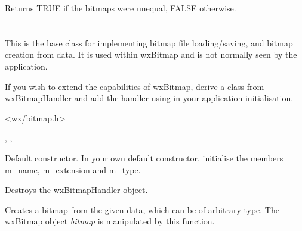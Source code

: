 
Returns TRUE if the bitmaps were unequal, FALSE otherwise.

\section{}\label{wxbitmaphandler}


This is the base class for implementing bitmap file loading/saving, and bitmap creation from data.
It is used within wxBitmap and is not normally seen by the application.

If you wish to extend the capabilities of wxBitmap, derive a class from wxBitmapHandler
and add the handler using  in your
application initialisation.




<wx/bitmap.h>


, , 


\label{wxbitmaphandlerconstr}


Default constructor. In your own default constructor, initialise the members
m\_name, m\_extension and m\_type.



Destroys the wxBitmapHandler object.



Creates a bitmap from the given data, which can be of arbitrary type. The wxBitmap object {\it bitmap} is
manipulated by this function.


